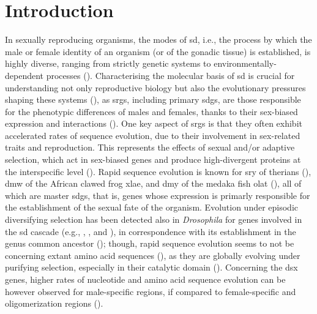 \section{Introduction} \label{chapter3_introduction}
In sexually reproducing organisms, the modes of \gls{sd}, i.e., the process by which the male or female identity of an organism (or of the gonadic tissue) is established, is highly diverse, ranging from strictly genetic systems to environmentally-dependent processes (). Characterising the molecular basis of \gls{sd} is crucial for understanding not only reproductive biology but also the evolutionary pressures shaping these systems (), as \glspl{srg}, including primary \glspl{sdg}, are those responsible for the phenotypic differences of males and females, thanks to their sex-biased expression and interactions (). One key aspect of \glspl{srg} is that they often exhibit accelerated rates of sequence evolution, due to their involvement in sex-related traits and reproduction. This represents the effects of sexual and/or adaptive selection, which act in sex-biased genes and produce high-divergent proteins at the interspecific level (). Rapid sequence evolution is known for \gls{sry} of therians (), \gls{dmw} of the African clawed frog \gls{xlae}, and \gls{dmy} of the medaka fish \gls{olat} (), all of which are master \glspl{sdg}, that is, genes whose expression is primarly responsible for the establishment of the sexual fate of the organism. Evolution under episodic diversifying selection has been detected also in \textit{Drosophila} for genes involved in the \gls{sd} cascade (e.g., , , and ), in correspondence with its establishment in the genus common ancestor (); though, rapid sequence evolution seems to not be concerning extant amino acid sequences (), as they are globally evolving under purifying selection, especially in their catalytic domain (). Concerning the \gls{dsx} genes, higher rates of nucleotide and amino acid sequence evolution can be however observed for male-specific regions, if compared to female-specific and oligomerization regions ().

